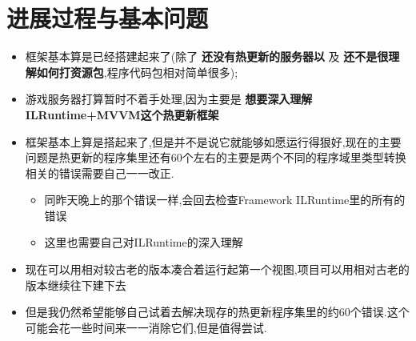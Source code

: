 \documentclass[9pt, b5paper]{article}
\begin{document}
\section{进展过程与基本问题}
\label{sec-4}
\begin{itemize}
\item 框架基本算是已经搭建起来了(除了 \textbf{还没有热更新的服务器以} 及 \textbf{还不是很理解如何打资源包},程序代码包相对简单很多);
\item 游戏服务器打算暂时不着手处理,因为主要是 \textbf{想要深入理解ILRuntime+MVVM这个热更新框架}
\item 框架基本上算是搭起来了,但是并不是说它就能够如愿运行得狠好,现在的主要问题是热更新的程序集里还有60个左右的主要是两个不同的程序域里类型转换相关的错误需要自己一一改正.
\begin{itemize}
\item 同昨天晚上的那个错误一样,会回去检查Framework ILRuntime里的所有的错误
\item 这里也需要自己对ILRuntime的深入理解
\end{itemize}
\item 现在可以用相对较古老的版本凑合着运行起第一个视图,项目可以用相对古老的版本继续往下建下去
\item 但是我仍然希望能够自己试着去解决现存的热更新程序集里的约60个错误.这个可能会花一些时间来一一消除它们,但是值得尝试.
\end{itemize}
\end{document}
